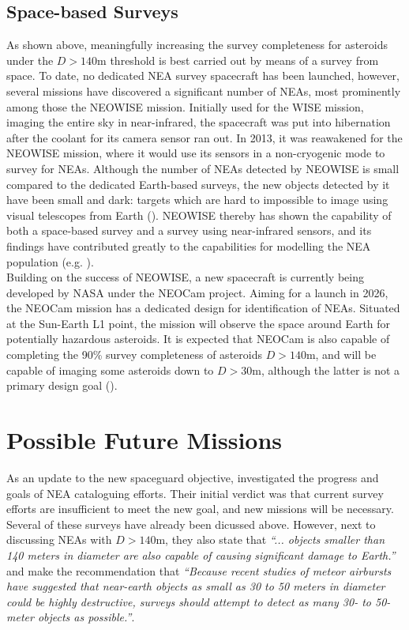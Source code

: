 \subsection{Space-based Surveys}
As shown above, meaningfully increasing the survey completeness for asteroids under the $D > 140 \mathrm{m}$ threshold is best carried out by means of a survey from space. To date, no dedicated NEA survey spacecraft has been launched, however, several missions have discovered a significant number of NEAs, most prominently among those the NEOWISE mission. Initially used for the WISE mission, imaging the entire sky in near-infrared, the spacecraft was put into hibernation after the coolant for its camera sensor ran out. In 2013, it was reawakened for the NEOWISE mission, where it would use its sensors in a non-cryogenic mode to survey for NEAs. Although the number of NEAs detected by NEOWISE is small compared to the dedicated Earth-based surveys, the new objects detected by it have been small and dark: targets which are hard to impossible to image using visual telescopes from Earth (\cite{NEOWISEResult}). NEOWISE thereby has shown the capability of both a space-based survey and a survey using near-infrared sensors, and its findings have contributed greatly to the capabilities for modelling the NEA population (e.g. \cite{GranvikPopulation}).\\

Building on the success of NEOWISE, a new spacecraft is currently being developed by NASA under the NEOCam project. Aiming for a launch in 2026, the NEOCam mission has a dedicated design for identification of NEAs. Situated at the Sun-Earth L1 point, the mission will observe the space around Earth for potentially hazardous asteroids. It is expected that NEOCam is also capable of completing the 90\% survey completeness of asteroids $D > 140 \mathrm{m}$, and will be capable of imaging some asteroids down to $D > 30 \mathrm{m}$, although the latter is not a primary design goal (\cite{NEOCam}).

\section{Possible Future Missions}
\label{sec:introductionproposals}
As an update to the new spaceguard objective, \cite{DefendingEarth} investigated the progress and goals of NEA cataloguing efforts. Their initial verdict was that current survey efforts are insufficient to meet the new goal, and new missions will be necessary. Several of these surveys have already been dicussed above. However, next to discussing NEAs with $D > 140 \mathrm{m}$, they also state that \textit{``... objects smaller than 140 meters in diameter are also capable of causing significant damage to Earth.''} and make the recommendation that \textit{``Because recent studies of meteor airbursts have suggested that near-earth objects as small as 30 to 50 meters in diameter could be highly destructive, surveys should attempt to detect as many 30- to 50-meter objects as possible.''}. \\

